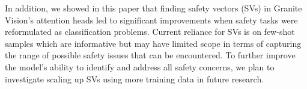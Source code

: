 In addition, we showed in this paper that finding safety vectors (SVs) in Granite Vision's attention heads led to significant improvements when safety tasks were reformulated as classification problems. Current reliance for SVs is on few-shot samples which are informative but may have limited scope in terms of capturing the range of possible safety issues that can be encountered. To further improve the model's ability to identify and address all safety concerns, we plan to investigate scaling up SVs using more training data in future research.














